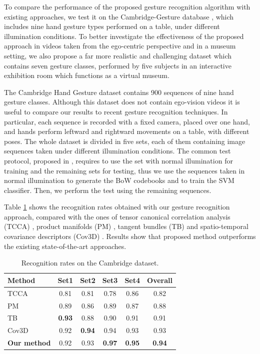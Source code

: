 To compare the performance of the proposed gesture recognition algorithm with existing approaches, we test it on the Cambridge-Gesture database \cite{kim2007tensor}, which includes nine hand gesture types performed on a table, under different illumination conditions. To better investigate the effectiveness of the proposed approach in videos taken from the ego-centric perspective and in a museum setting, we also propose a far more realistic and challenging dataset which contains seven gesture classes, performed by five subjects in an interactive exhibition room which functions as a virtual museum. 

The Cambridge Hand Gesture dataset contains 900 sequences of nine hand gesture classes. Although this dataset does not contain ego-vision videos it is useful to compare our results to recent gesture recognition techniques. In particular, each sequence is recorded with a fixed camera, placed over one hand, and hands perform leftward and rightward movements on a table, with different poses. The whole dataset is divided in five sets, each of them containing image sequences taken under different illumination conditions. The common test protocol, proposed in \cite{kim2007tensor}, requires to use the set with normal illumination for training and the remaining sets for testing, thus we use the sequences taken in normal illumination to generate the BoW codebooks and to train the SVM classifier. Then, we perform the test using the remaining sequences.   

Table \ref{cambridge} shows the recognition rates obtained with our gesture recognition approach, compared with the ones of tensor canonical correlation analysis (TCCA) \cite{kim2009canonical}, product manifolds (PM) \cite{lui2010action}, tangent bundles (TB) \cite{lui2011tangent} and spatio-temporal covariance descriptors (Cov3D) \cite{sanin2013spatio}. Results show that proposed method outperforms the existing state-of-the-art approaches.


\begin{table}
\begin{center}
\begin{tabular}{|l|c|c|c|c|c|}
\hline
Method					& Set1		& Set2		& Set3		& Set4	 	& Overall \\
\hline
\hline
TCCA \cite{kim2009canonical}		& 0.81		& 0.81		& 0.78		& 0.86		& 0.82 \\
PM \cite{lui2010action}			& 0.89		& 0.86		& 0.89		& 0.87		& 0.88  \\
TB \cite{lui2011tangent}			& \textbf{0.93}	& 0.88		& 0.90		& 0.91		& 0.91 \\
Cov3D \cite{sanin2013spatio}		& 0.92		&\textbf{0.94}	& 0.94		& 0.93		& 0.93 \\
\textbf{Our method}			& 0.92		& 0.93		& \textbf{0.97}	& \textbf{0.95}	& \textbf{0.94} \\
\hline
\end{tabular}
\end{center}
\caption{Recognition rates on the Cambridge dataset.}
\label{cambridge}
\end{table}



